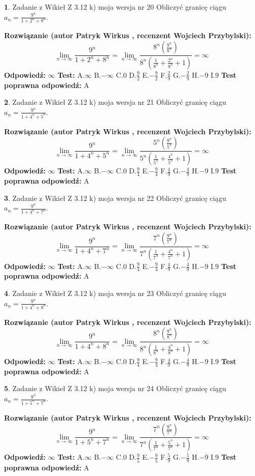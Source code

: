 \documentclass[12pt, a4paper]{article}
\theoremstyle{definition} %
\newtheorem{zad}{}
\newcommand{\zadStart}[1]{\begin{zad}#1\newline}
\newcommand{\zadStop}{\end{zad}}
\newcommand{\rozwStart}[2]{\noindent \textbf{Rozwiązanie (autor #1 , recenzent #2): }\newline}
\newcommand{\rozwStop}{\newline}
\newcommand{\odpStart}{\noindent \textbf{Odpowiedź:}\newline}
\newcommand{\odpStop}{\newline}
\newcommand{\testStart}{\noindent \textbf{Test:}\newline}
\newcommand{\testStop}{\newline}
\newcommand{\kluczStart}{\noindent \textbf{Test poprawna odpowiedź:}\newline}
\newcommand{\kluczStop}{\newline}
\begin{document}
\zadStart{Zadanie z Wikieł Z 3.12 k) moja wersja nr 20}
Obliczyć granicę ciągu $a_{n}=\frac{9^{n}}{1+2^{n} + 8^{n}}$.
\zadStop
\rozwStart{Patryk Wirkus}{Wojciech Przybylski}
$$\lim\limits_{n\to\infty}\frac{9^{n}}{1+2^{n} + 8^{n}}=
\lim\limits_{n\to\infty}\frac{8^{n}(\frac{9^{n}}{8^{n}} )}{8^{n}(\frac{1}{8^{n}}+\frac{2^{n}}{8^{n}}+1)} = \infty$$
\rozwStop
\odpStart
$\infty$
\odpStop
\testStart
A.$\infty$
B.$-\infty$
C.$0$
D.$\frac{9}{2}$
E.$-\frac{9}{2}$
F.$\frac{2}{9}$
G.$-\frac{2}{9}$
H.$-9$
I.$9$
\testStop
\kluczStart
A
\kluczStop



\zadStart{Zadanie z Wikieł Z 3.12 k) moja wersja nr 21}
Obliczyć granicę ciągu $a_{n}=\frac{9^{n}}{1+4^{n} + 5^{n}}$.
\zadStop
\rozwStart{Patryk Wirkus}{Wojciech Przybylski}
$$\lim\limits_{n\to\infty}\frac{9^{n}}{1+4^{n} + 5^{n}}=
\lim\limits_{n\to\infty}\frac{5^{n}(\frac{9^{n}}{5^{n}} )}{5^{n}(\frac{1}{5^{n}}+\frac{4^{n}}{5^{n}}+1)} = \infty$$
\rozwStop
\odpStart
$\infty$
\odpStop
\testStart
A.$\infty$
B.$-\infty$
C.$0$
D.$\frac{9}{4}$
E.$-\frac{9}{4}$
F.$\frac{4}{9}$
G.$-\frac{4}{9}$
H.$-9$
I.$9$
\testStop
\kluczStart
A
\kluczStop



\zadStart{Zadanie z Wikieł Z 3.12 k) moja wersja nr 22}
Obliczyć granicę ciągu $a_{n}=\frac{9^{n}}{1+4^{n} + 7^{n}}$.
\zadStop
\rozwStart{Patryk Wirkus}{Wojciech Przybylski}
$$\lim\limits_{n\to\infty}\frac{9^{n}}{1+4^{n} + 7^{n}}=
\lim\limits_{n\to\infty}\frac{7^{n}(\frac{9^{n}}{7^{n}} )}{7^{n}(\frac{1}{7^{n}}+\frac{4^{n}}{7^{n}}+1)} = \infty$$
\rozwStop
\odpStart
$\infty$
\odpStop
\testStart
A.$\infty$
B.$-\infty$
C.$0$
D.$\frac{9}{4}$
E.$-\frac{9}{4}$
F.$\frac{4}{9}$
G.$-\frac{4}{9}$
H.$-9$
I.$9$
\testStop
\kluczStart
A
\kluczStop



\zadStart{Zadanie z Wikieł Z 3.12 k) moja wersja nr 23}
Obliczyć granicę ciągu $a_{n}=\frac{9^{n}}{1+4^{n} + 8^{n}}$.
\zadStop
\rozwStart{Patryk Wirkus}{Wojciech Przybylski}
$$\lim\limits_{n\to\infty}\frac{9^{n}}{1+4^{n} + 8^{n}}=
\lim\limits_{n\to\infty}\frac{8^{n}(\frac{9^{n}}{8^{n}} )}{8^{n}(\frac{1}{8^{n}}+\frac{4^{n}}{8^{n}}+1)} = \infty$$
\rozwStop
\odpStart
$\infty$
\odpStop
\testStart
A.$\infty$
B.$-\infty$
C.$0$
D.$\frac{9}{4}$
E.$-\frac{9}{4}$
F.$\frac{4}{9}$
G.$-\frac{4}{9}$
H.$-9$
I.$9$
\testStop
\kluczStart
A
\kluczStop



\zadStart{Zadanie z Wikieł Z 3.12 k) moja wersja nr 24}
Obliczyć granicę ciągu $a_{n}=\frac{9^{n}}{1+5^{n} + 7^{n}}$.
\zadStop
\rozwStart{Patryk Wirkus}{Wojciech Przybylski}
$$\lim\limits_{n\to\infty}\frac{9^{n}}{1+5^{n} + 7^{n}}=
\lim\limits_{n\to\infty}\frac{7^{n}(\frac{9^{n}}{7^{n}} )}{7^{n}(\frac{1}{7^{n}}+\frac{5^{n}}{7^{n}}+1)} = \infty$$
\rozwStop
\odpStart
$\infty$
\odpStop
\testStart
A.$\infty$
B.$-\infty$
C.$0$
D.$\frac{9}{5}$
E.$-\frac{9}{5}$
F.$\frac{5}{9}$
G.$-\frac{5}{9}$
H.$-9$
I.$9$
\testStop
\kluczStart
A
\kluczStop
\end{document}
